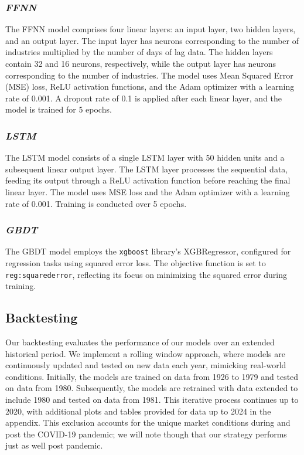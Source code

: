 \documentclass{article}
\begin{document}
\subsubsection{\emph{FFNN}}
The FFNN model comprises four linear layers: an input layer, two hidden layers, and an output layer. The input layer has neurons corresponding to the number of industries multiplied by the number of days of lag data. The hidden layers contain 32 and 16 neurons, respectively, while the output layer has neurons corresponding to the number of industries. The model uses Mean Squared Error (MSE) loss, ReLU activation functions, and the Adam optimizer with a learning rate of 0.001. A dropout rate of 0.1 is applied after each linear layer, and the model is trained for 5 epochs.

\subsubsection{\emph{LSTM}}
The LSTM model consists of a single LSTM layer with 50 hidden units and a subsequent linear output layer. The LSTM layer processes the sequential data, feeding its output through a ReLU activation function before reaching the final linear layer. The model uses MSE loss and the Adam optimizer with a learning rate of 0.001. Training is conducted over 5 epochs.

\subsubsection{\emph{GBDT}}
The GBDT model employs the \texttt{xgboost} library's XGBRegressor, configured for regression tasks using squared error loss. The objective function is set to \texttt{reg:squarederror}, reflecting its focus on minimizing the squared error during training.

\subsection{Backtesting}
Our backtesting evaluates the performance of our models over an extended historical period. We implement a rolling window approach, where models are continuously updated and tested on new data each year, mimicking real-world conditions. Initially, the models are trained on data from 1926 to 1979 and tested on data from 1980. Subsequently, the models are retrained with data extended to include 1980 and tested on data from 1981. This iterative process continues up to 2020, with additional plots and tables provided for data up to 2024 in the appendix. This exclusion accounts for the unique market conditions during and post the COVID-19 pandemic; we will note though that our strategy performs just as well post pandemic.
\end{document}
